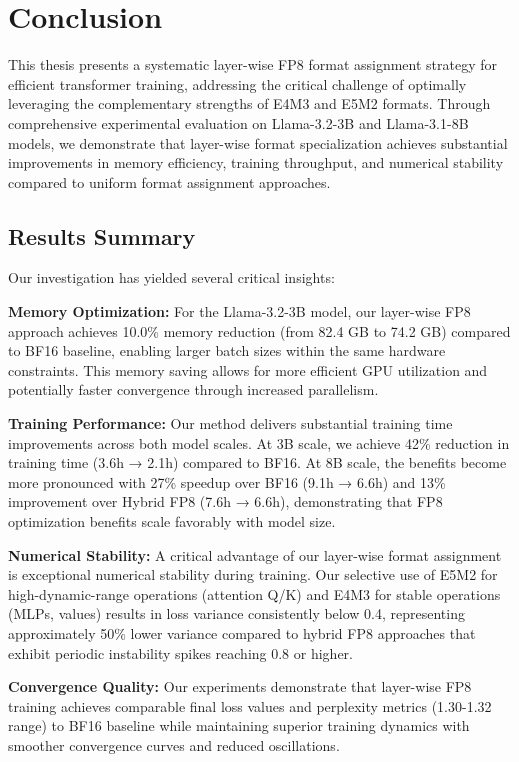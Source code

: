 \chapter*{Conclusion} 

This thesis presents a systematic layer-wise FP8 format assignment strategy for efficient transformer training, addressing the critical challenge of optimally leveraging the complementary strengths of E4M3 and E5M2 formats. Through comprehensive experimental evaluation on Llama-3.2-3B and Llama-3.1-8B models, we demonstrate that layer-wise format specialization achieves substantial improvements in memory efficiency, training throughput, and numerical stability compared to uniform format assignment approaches.

\section*{Results Summary}

Our investigation has yielded several critical insights:

\textbf{Memory Optimization:} For the Llama-3.2-3B model, our layer-wise FP8 approach achieves 10.0\% memory reduction (from 82.4 GB to 74.2 GB) compared to BF16 baseline, enabling larger batch sizes within the same hardware constraints. This memory saving allows for more efficient GPU utilization and potentially faster convergence through increased parallelism.

\textbf{Training Performance:} Our method delivers substantial training time improvements across both model scales. At 3B scale, we achieve 42\% reduction in training time (3.6h → 2.1h) compared to BF16. At 8B scale, the benefits become more pronounced with 27\% speedup over BF16 (9.1h → 6.6h) and 13\% improvement over Hybrid FP8 (7.6h → 6.6h), demonstrating that FP8 optimization benefits scale favorably with model size.

\textbf{Numerical Stability:} A critical advantage of our layer-wise format assignment is exceptional numerical stability during training. Our selective use of E5M2 for high-dynamic-range operations (attention Q/K) and E4M3 for stable operations (MLPs, values) results in loss variance consistently below 0.4, representing approximately 50\% lower variance compared to hybrid FP8 approaches that exhibit periodic instability spikes reaching 0.8 or higher.

\textbf{Convergence Quality:} Our experiments demonstrate that layer-wise FP8 training achieves comparable final loss values and perplexity metrics (1.30-1.32 range) to BF16 baseline while maintaining superior training dynamics with smoother convergence curves and reduced oscillations.

